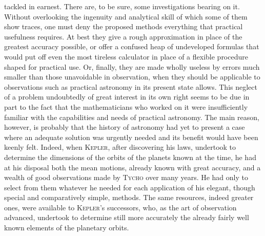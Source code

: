 tackled in earnest. There are, to be sure, some investigations bearing on it. Without overlooking the ingenuity and analytical skill of which some of them show traces, one must deny the proposed methods everything that practical usefulness requires. At best they give a rough approximation in place of the greatest accuracy possible, or offer a confused heap of undeveloped formulas that would put off even the most tireless calculator in place of a flexible procedure shaped for practical use. Or, finally, they are made wholly useless by errors much smaller than those unavoidable in observation, when they should be applicable to observations such as practical astronomy in its present state allows. This neglect of a problem undoubtedly of great interest in its own right seems to be due in part to the fact that the mathematicians who worked on it were insufficiently familiar with the capabilities and needs of practical astronomy. The main reason, however, is probably that the history of astronomy had yet to present a case where an adequate solution was urgently needed and its benefit would have been keenly felt. Indeed, when \textsc{Kepler}, after discovering his laws, undertook to determine the dimensions of the orbits of the planets known at the time, he had at his disposal both the mean motions, already known with great accuracy, and a wealth of good observations made by \textsc{Tycho} over many years. He had only to select from them whatever he needed for each application of his elegant, though special and comparatively simple, methods. The same resources, indeed greater ones, were available to \textsc{Kepler}’s successors, who, as the art of observation advanced, undertook to determine still more accurately the already fairly well known elements of the planetary orbits.

